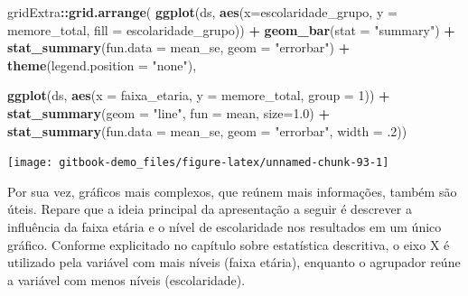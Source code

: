 \documentclass[
]{book}
\newenvironment{Shaded}{\begin{snugshade}}{\end{snugshade}}
\newcommand{\DataTypeTok}[1]{\textcolor[rgb]{0.13,0.29,0.53}{#1}}
\newcommand{\DecValTok}[1]{\textcolor[rgb]{0.00,0.00,0.81}{#1}}
\newcommand{\FloatTok}[1]{\textcolor[rgb]{0.00,0.00,0.81}{#1}}
\newcommand{\KeywordTok}[1]{\textcolor[rgb]{0.13,0.29,0.53}{\textbf{#1}}}
\newcommand{\NormalTok}[1]{#1}
\newcommand{\OperatorTok}[1]{\textcolor[rgb]{0.81,0.36,0.00}{\textbf{#1}}}
\newcommand{\StringTok}[1]{\textcolor[rgb]{0.31,0.60,0.02}{#1}}
\begin{document}
\begin{Shaded}
\begin{Highlighting}[]
\NormalTok{gridExtra}\OperatorTok{::}\KeywordTok{grid.arrange}\NormalTok{(}
  \KeywordTok{ggplot}\NormalTok{(ds, }\KeywordTok{aes}\NormalTok{(}\DataTypeTok{x=}\NormalTok{escolaridade_grupo, }\DataTypeTok{y =}\NormalTok{ memore_total, }
                 \DataTypeTok{fill =}\NormalTok{ escolaridade_grupo)) }\OperatorTok{+}
\StringTok{    }\KeywordTok{geom_bar}\NormalTok{(}\DataTypeTok{stat =} \StringTok{"summary"}\NormalTok{) }\OperatorTok{+}
\StringTok{    }\KeywordTok{stat_summary}\NormalTok{(}\DataTypeTok{fun.data =}\NormalTok{ mean_se, }\DataTypeTok{geom =} \StringTok{"errorbar"}\NormalTok{) }\OperatorTok{+}
\StringTok{    }\KeywordTok{theme}\NormalTok{(}\DataTypeTok{legend.position =} \StringTok{"none"}\NormalTok{),}
  
  \KeywordTok{ggplot}\NormalTok{(ds, }\KeywordTok{aes}\NormalTok{(}\DataTypeTok{x =}\NormalTok{ faixa_etaria, }\DataTypeTok{y =}\NormalTok{ memore_total, }\DataTypeTok{group =} \DecValTok{1}\NormalTok{)) }\OperatorTok{+}
\StringTok{  }\KeywordTok{stat_summary}\NormalTok{(}\DataTypeTok{geom =} \StringTok{"line"}\NormalTok{, }\DataTypeTok{fun =}\NormalTok{ mean, }\DataTypeTok{size=}\FloatTok{1.0}\NormalTok{) }\OperatorTok{+}
\StringTok{  }\KeywordTok{stat_summary}\NormalTok{(}\DataTypeTok{fun.data =}\NormalTok{ mean_se, }\DataTypeTok{geom =} \StringTok{"errorbar"}\NormalTok{, }\DataTypeTok{width =} \FloatTok{.2}\NormalTok{))}
\end{Highlighting}
\end{Shaded}

\begin{center}\texttt{[image: gitbook-demo\_files/figure-latex/unnamed-chunk-93-1]} \end{center}

Por sua vez, gráficos mais complexos, que reúnem mais informações, também são úteis. Repare que a ideia principal da apresentação a seguir é descrever a influência da faixa etária e o nível de escolaridade nos resultados em um único gráfico. Conforme explicitado no capítulo sobre estatística descritiva, o eixo X é utilizado pela variável com mais níveis (faixa etária), enquanto o agrupador reúne a variável com menos níveis (escolaridade).
\end{document}
